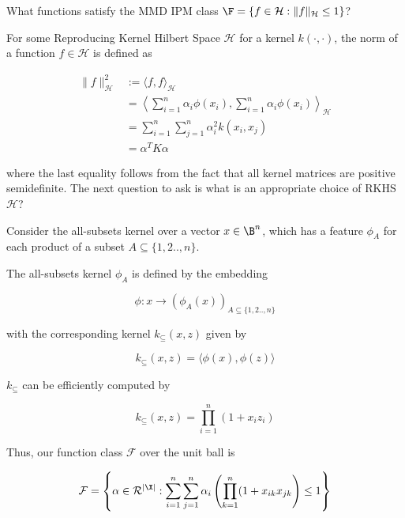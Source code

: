 What functions satisfy the MMD IPM class  $\F = \{f \in \mathcal{H}: \|f\|_\mathcal{H} \leq 1 \}$? 

For some Reproducing Kernel Hilbert Space $\mathcal{H}$ for a kernel $k(\cdot,\cdot)$, the norm of a function $f \in \mathcal{H}$ is defined as 

\begin{align*}
    \| f \|^2_\mathcal{H} &:= \langle f, f \rangle _\mathcal{H}  \\
    &= \left \langle \sum_{i=1}^n \alpha_i \phi(x_i) , \sum_{i=1}^n \alpha_i \phi(x_i)   \right\rangle  _\mathcal{H} \\
    &= \sum_{i=1}^n \sum_{j=1}^n \alpha_i^2 k(x_i, x_j) \\
    &= \alpha^TK\alpha
\end{align*}

where the last equality follows from the fact that all kernel matrices are positive semidefinite. The next question to ask is what is an appropriate choice of RKHS $\mathcal{H}$? 


Consider the all-subsets kernel over a vector $x \in \B^n$, which has a feature $\phi_A$ for each product of a subset $A \subseteq \{1,2..,n\}$. 

\begin{definition}
    The all-subsets kernel $\phi_A$ is defined by the embedding
    
    \begin{equation}
        \phi : x \to (\phi_A(x))_{A \subseteq \{1,2..,n\}}
    \end{equation}

    with the corresponding kernel $k_\subseteq(x,z)$ given by
    
    \begin{equation}
        k_\subseteq(x,z) = \langle \phi(x), \phi(z) \rangle 
    \end{equation}
    
    $k_\subseteq$ can be efficiently computed by

    \begin{equation}
        k_\subseteq(x,z) = \prod_{i=1}^n (1 + x_iz_i)
    \end{equation}
\end{definition}

Thus, our function class $\mathcal{F}$ over the unit ball is 


\begin{equation}
    \mathcal{F} = \left\{\alpha \in \mathcal{R}^{|\X|} : \sum_{i = 1}^n \sum_{j=1}^n \alpha_i \left(\prod_{k=1}^n (1+ x_{ik}x_{jk}\right) \leq 1 \right\}
\end{equation}